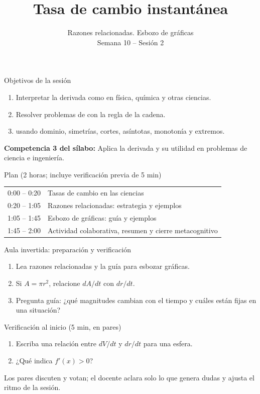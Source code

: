 \documentclass[10pt,aspectratio=169]{beamer}
\title[Tasas de cambio y gráficas]{Tasa de cambio instantánea}
\subtitle{Razones relacionadas. Esbozo de gráficas\\[2pt]\small Semana 10 -- Sesión 2}
\begin{document}
\begin{frame}
  \titlepage
\end{frame}

\begin{frame}{Objetivos de la sesión}
  \begin{enumerate}
    \item Interpretar la derivada como  en física, química y otras ciencias.
    \item Resolver problemas de  con la regla de la cadena.
    \item {} usando dominio, simetrías, cortes, asíntotas, monotonía y extremos.
  \end{enumerate}
  \vspace{1mm}
  {\small\textbf{Competencia 3 del sílabo:} Aplica la derivada y su utilidad en problemas de ciencia e ingeniería.}
  \begin{block}{Plan (2 horas; incluye verificación previa de 5 min)}
    \begin{tabular}{ll}
      0:00 -- 0:20 & Tasas de cambio en las ciencias\\
      0:20 -- 1:05 & Razones relacionadas: estrategia y ejemplos\\
      1:05 -- 1:45 & Esbozo de gráficas: guía y ejemplos\\
      1:45 -- 2:00 & Actividad colaborativa, resumen y cierre metacognitivo
    \end{tabular}
  \end{block}
\end{frame}

\begin{frame}{Aula invertida: preparación y verificación}
  \small
  \begin{previa}
    \begin{enumerate}
      \item Lea razones relacionadas y la guía para esbozar gráficas.
      \item Si $A=\pi r^2$, relacione $dA/dt$ con $dr/dt$.
      \item Pregunta guía: ¿qué magnitudes cambian con el tiempo y cuáles están fijas en una situación?
    \end{enumerate}
  \end{previa}
  \begin{block}{Verificación al inicio (5 min, en pares)}
    \begin{enumerate}
      \item Escriba una relación entre $dV/dt$ y $dr/dt$ para una esfera.
      \item ¿Qué indica $f'(x)>0$?
    \end{enumerate}
    Los pares discuten y votan; el docente aclara solo lo que genera dudas y ajusta el ritmo de la sesión.
  \end{block}
\end{frame}
\end{document}
